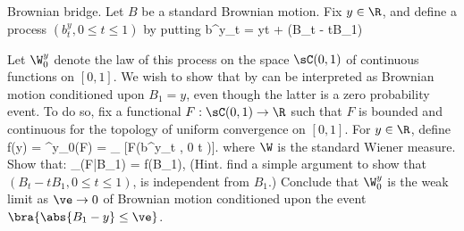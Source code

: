 

\item [1.3] Brownian bridge. Let $B$ be a standard Brownian motion. Fix $y \in \R$, and define a process $(b^y_t , 0 \leq t \leq 1)$ by putting 
\be
b^y_t = yt + (B_t - tB_1)
\ee

Let $\W^y_0$ denote the law of this process on the space $\sC(0, 1)$ of continuous functions on $[0, 1]$. We wish to show that by can be interpreted as Brownian motion conditioned upon $B_1 = y$, even though the latter is a zero probability event. To do so, fix a functional $F :\sC(0, 1) \to\R$ such that $F$ is bounded and continuous for the topology of uniform convergence on $[0, 1]$. For $y \in\R$, define
\be
f(y) = \W^y_0(F) = \E_{\W} [F(b^y_t , 0 \leq t )].
\ee
where $\W$ is the standard Wiener measure. Show that:
\be
\E_{\W}(F|B_1) = f(B_1),\quad{}
\ee
(Hint. find a simple argument to show that $(B_t - tB_1, 0 \leq t \leq 1)$, is independent from $B_1$.) Conclude that $\W^y_0$ is the weak limit as $\ve\to 0$ of Brownian motion conditioned upon the event $\bra{\abs{B_1 - y} \leq \ve}$.

